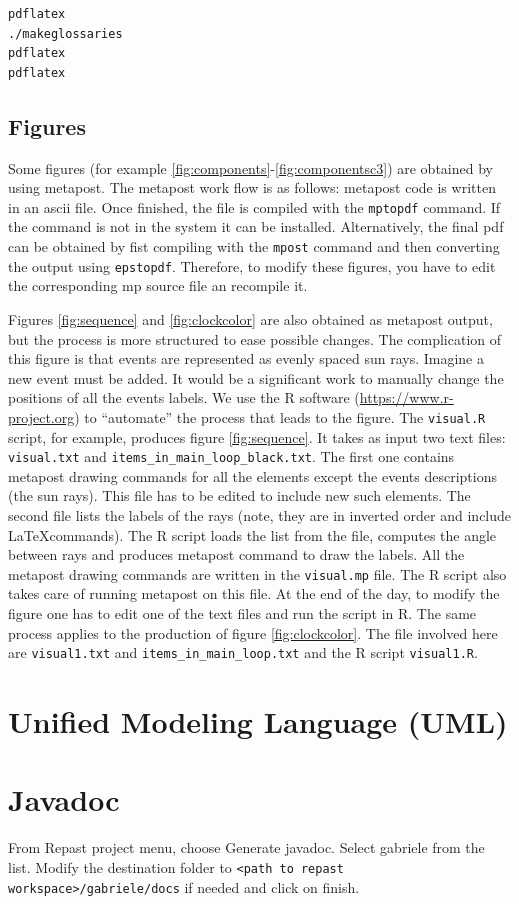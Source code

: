\documentclass{book}
\begin{document}
\begin{verbatim}
pdflatex
./makeglossaries
pdflatex
pdflatex
\end{verbatim}


\section{Figures}

Some figures (for example \ref{fig:components}-\ref{fig:componentsc3}) are obtained by using metapost.
The metapost work flow is as follows: metapost code is written in an ascii file.   
Once finished, the file is compiled with the \verb+mptopdf+ command. If the command is not in the system it can be installed. Alternatively, the final pdf can be obtained by fist compiling with the \verb+mpost+ command and then converting the output using \verb+epstopdf+.
Therefore, to modify these figures, you have to edit the corresponding mp source file an recompile it. 

Figures \ref{fig:sequence} and \ref{fig:clockcolor} are also obtained as metapost output, but the process is more structured to ease possible changes. The complication of this figure is that events are represented as evenly spaced sun rays. Imagine a new event must be added. It would be a significant work to manually change the positions of all the events labels. We use the R software (\href{https://www.r-project.org}{https://www.r-project.org}) to ``automate'' the process that leads to the figure. The \verb+visual.R+ script, for example, produces figure \ref{fig:sequence}. It takes as input two text files: \verb+visual.txt+ and \verb+items_in_main_loop_black.txt+. The first one contains metapost drawing commands for all the elements except the events descriptions (the sun rays). This file has to be edited to include new such elements. The second file lists the labels of the rays (note, they are in inverted order and include \LaTeX commands). The R script loads the list from the file, computes the angle between rays and produces metapost command to draw the labels. All the metapost drawing commands are written in the \verb+visual.mp+ file. The R script also takes care of running metapost on this file.
At the end of the day, to modify the figure one has to edit one of the text files and run the script in R. The same process applies to the production of figure \ref{fig:clockcolor}. The file involved here are \verb+visual1.txt+ and \verb+items_in_main_loop.txt+ and the R script \verb+visual1.R+.


\chapter{Unified Modeling Language (UML)}


\chapter{Javadoc}

From Repast project menu, choose Generate javadoc. Select gabriele from the list. Modify the destination folder to 
\verb+<path to repast workspace>/gabriele/docs+ if needed and click on finish.
\end{document}
